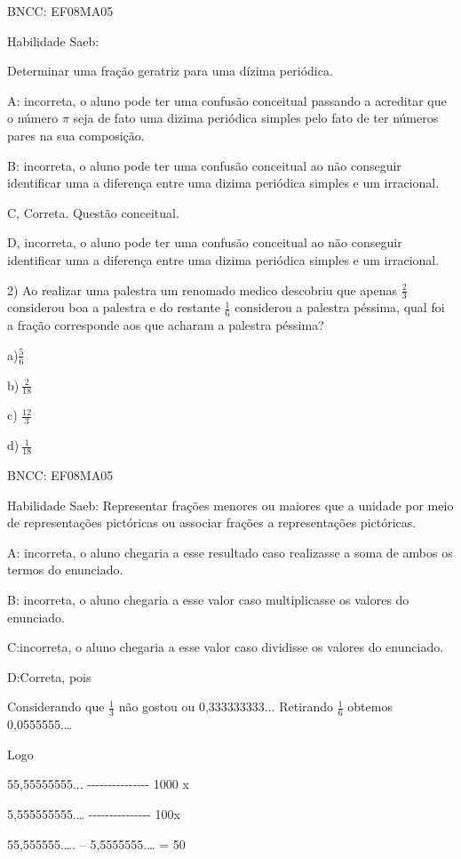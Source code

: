 {BNCC: EF08MA05

Habilidade Saeb:

Determinar uma fração geratriz para uma dízima periódica.

A: incorreta, o aluno pode ter uma confusão conceitual passando a
acreditar que o número \(\pi\) seja de fato uma dizima periódica simples
pelo fato de ter números pares na sua composição.

B: incorreta, o aluno pode ter uma confusão conceitual ao não conseguir
identificar uma a diferença entre uma dizima periódica simples e um
irracional.

C, Correta. Questão conceitual.

D, incorreta, o aluno pode ter uma confusão conceitual ao não conseguir
identificar uma a diferença entre uma dizima periódica simples e um
irracional.

2) Ao realizar uma palestra um renomado medico descobriu que apenas
\(\frac{2}{3}\) considerou boa a palestra e do restante \(\frac{1}{6}\)
considerou a palestra péssima, qual foi a fração corresponde aos que
acharam a palestra péssima?

a)\(\frac{5}{6}\)

b)\(\ \frac{2}{18}\)

c) \(\frac{12}{3}\)

d)\(\ \frac{1}{18}\)

BNCC: EF08MA05

Habilidade Saeb: Representar frações menores ou maiores que a unidade
por meio de representações pictóricas ou associar frações a
representações pictóricas.

A: incorreta, o aluno chegaria a esse resultado caso realizasse a soma
de ambos os termos do enunciado.

B: incorreta, o aluno chegaria a esse valor caso multiplicasse os
valores do enunciado.

C:incorreta, o aluno chegaria a esse valor caso dividisse os valores do
enunciado.

D:Correta, pois

Considerando que \(\frac{1}{3}\) não gostou ou 0,333333333... Retirando
\(\frac{1}{6}\) obtemos 0,0555555.\ldots{}

Logo

55,55555555... -\/-\/-\/-\/-\/-\/-\/-\/-\/-\/-\/-\/-\/-\/- 1000 x

5,555555555.\ldots{} -\/-\/-\/-\/-\/-\/-\/-\/-\/-\/-\/-\/-\/-\/- 100x

55,555555.\ldots. -- 5,5555555.\ldots{} = 50

}
